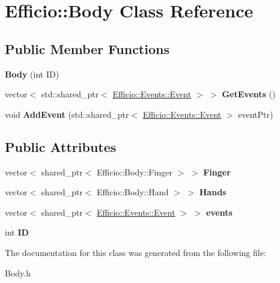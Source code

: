 \hypertarget{class_efficio_1_1_body}{}\section{Efficio\+:\+:Body Class Reference}
\label{class_efficio_1_1_body}
\subsection*{Public Member Functions}
\begin{DoxyCompactItemize}
\item 
{\bfseries Body} (int ID)\hypertarget{class_efficio_1_1_body_a9590bede3bfa02bb53878cd3dcf9143e}{}\label{class_efficio_1_1_body_a9590bede3bfa02bb53878cd3dcf9143e}

\item 
vector$<$ std\+::shared\+\_\+ptr$<$ \hyperlink{class_efficio_1_1_events_1_1_event}{Efficio\+::\+Events\+::\+Event} $>$ $>$ {\bfseries Get\+Events} ()\hypertarget{class_efficio_1_1_body_a4fc4cd582563185ea556809253ed4992}{}\label{class_efficio_1_1_body_a4fc4cd582563185ea556809253ed4992}

\item 
void {\bfseries Add\+Event} (std\+::shared\+\_\+ptr$<$ \hyperlink{class_efficio_1_1_events_1_1_event}{Efficio\+::\+Events\+::\+Event} $>$ event\+Ptr)\hypertarget{class_efficio_1_1_body_aeacb5c899f96598b123a433c36c913f2}{}\label{class_efficio_1_1_body_aeacb5c899f96598b123a433c36c913f2}

\end{DoxyCompactItemize}
\subsection*{Public Attributes}
\begin{DoxyCompactItemize}
\item 
vector$<$ shared\+\_\+ptr$<$ Efficio\+::\+Body\+::\+Finger $>$ $>$ {\bfseries Finger}\hypertarget{class_efficio_1_1_body_addda49a5c2eb6ae7b60ec2d7465cbdf7}{}\label{class_efficio_1_1_body_addda49a5c2eb6ae7b60ec2d7465cbdf7}

\item 
vector$<$ shared\+\_\+ptr$<$ Efficio\+::\+Body\+::\+Hand $>$ $>$ {\bfseries Hands}\hypertarget{class_efficio_1_1_body_a7d30f51e82ab834c976beac1183a115f}{}\label{class_efficio_1_1_body_a7d30f51e82ab834c976beac1183a115f}

\item 
vector$<$ shared\+\_\+ptr$<$ \hyperlink{class_efficio_1_1_events_1_1_event}{Efficio\+::\+Events\+::\+Event} $>$ $>$ {\bfseries events}\hypertarget{class_efficio_1_1_body_a13f535b3541b6ea9b4bedfafd1512b46}{}\label{class_efficio_1_1_body_a13f535b3541b6ea9b4bedfafd1512b46}

\item 
int {\bfseries ID}\hypertarget{class_efficio_1_1_body_a58fe808d6666d9678a36b2eb0e62822a}{}\label{class_efficio_1_1_body_a58fe808d6666d9678a36b2eb0e62822a}

\end{DoxyCompactItemize}


The documentation for this class was generated from the following file\+:\begin{DoxyCompactItemize}
\item 
Body.\+h\end{DoxyCompactItemize}
